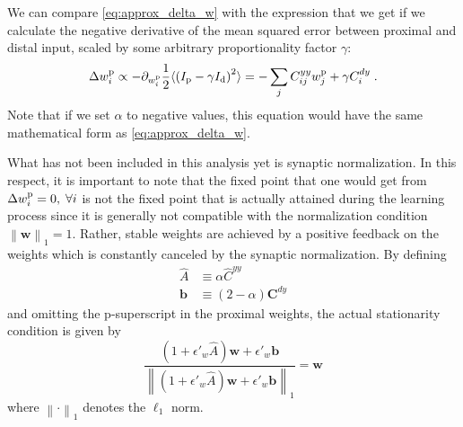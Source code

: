 \documentclass[10pt,a4paper]{article}
\newcommand{\avg}[1]{\langle #1 \rangle}
\begin{document}
We can compare \eqref{eq:approx_delta_w} with the expression that we get if we calculate the negative derivative of the mean squared error between proximal and distal input, scaled by some arbitrary proportionality factor $\gamma$:
\begin{equation}
\Delta w^{\rm p}_{i} \propto -\partial_{w^{\rm p}_{i}} \frac{1}{2}\avg{\left( I_{\rm p} -\gamma I_{\rm d} \right)^2} = -\sum_j C^{yy}_{ij} w^{\rm p}_{j} + \gamma C^{dy}_i \; . \label{eq:mse_diff}
\end{equation} 
Note that if we set $\alpha$ to negative values, this equation would have the same mathematical form as \eqref{eq:approx_delta_w}.

What has not been included in this analysis yet is synaptic normalization. In this respect, it is important to note that the fixed point that one would get from $\Delta w^{\rm p}_{i} = 0, \; \forall i$ is not the fixed point that is actually attained during the learning process since it is generally not compatible with the normalization condition $\left\lVert \mathbf{w} \right\rVert_1 = 1$. Rather, stable weights are achieved by a positive feedback on the weights which is constantly canceled by the synaptic normalization. By defining
\begin{align}
	\widehat{A} &\equiv \alpha \widehat{C}^{yy} \\
	\mathbf{b} &\equiv (2-\alpha) \mathbf{C}^{dy}
\end{align}
and omitting the p-superscript in the proximal weights, the actual stationarity condition is given by
\begin{equation}
	\frac{\left(1 + \epsilon'_w \widehat{A}\right)\mathbf{w} + \epsilon'_w \mathbf{b}}{\left\lVert \left(1 + \epsilon'_w \widehat{A}\right)\mathbf{w} + \epsilon'_w \mathbf{b} \right\rVert_1} = \mathbf{w} \label{eq:stab_cond_w}
\end{equation}
where $\left\lVert \cdot \right\rVert_1$ denotes the $\ell_1$ norm.
\end{document}
